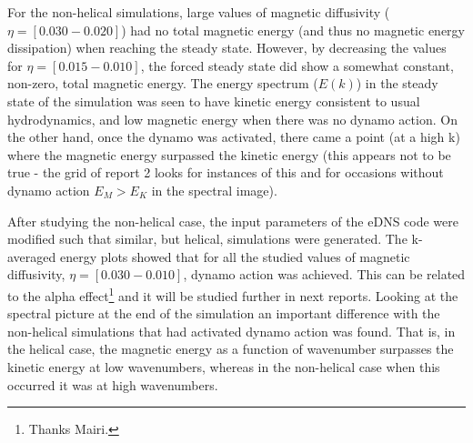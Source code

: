 \documentclass[a4paper,12pt]{article}
\begin{document}
For the non-helical simulations, large values of magnetic diffusivity ($\eta = [0.030-0.020]$) had no total magnetic energy (and thus no magnetic energy dissipation) when reaching the steady state. However, by decreasing the values for $\eta=[0.015-0.010]$, the forced steady state did show a somewhat constant, non-zero, total magnetic energy. The energy spectrum ($E(k)$) in the steady state of the simulation was seen to have kinetic energy consistent to usual hydrodynamics, and low magnetic energy when there was no dynamo action. On the other hand, once the dynamo was activated, there came a point (at a high k) where the magnetic energy surpassed the kinetic energy (this appears not to be true - the grid of report 2 looks for instances of this and for occasions without dynamo action $E_M > E_K$ in the spectral image).

After studying the non-helical case, the input parameters of the eDNS code were modified such that similar, but helical, simulations were generated. The k-averaged energy plots showed that for all the studied values of magnetic diffusivity, $\eta=[0.030-0.010]$, dynamo action was achieved. This can be related to the alpha effect\footnote{Thanks Mairi.} and it will be studied further in next reports. Looking at the spectral picture at the end of the simulation an important difference with the non-helical simulations that had activated dynamo action was found. That is, in the helical case, the magnetic energy as a function of wavenumber surpasses the kinetic energy at low wavenumbers, whereas in the non-helical case when this occurred it was at high wavenumbers. 


\newpage



\end{document}
